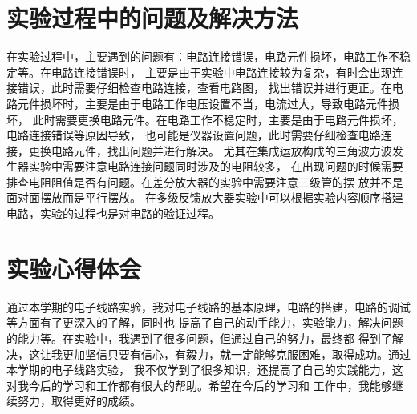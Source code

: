 \documentclass[12p,UTF8]{article}
\begin{document}
\begin{spacing}{1.25}
  \section{实验过程中的问题及解决方法}
  在实验过程中，主要遇到的问题有：电路连接错误，电路元件损坏，电路工作不稳定等。在电路连接错误时，
  主要是由于实验中电路连接较为复杂，有时会出现连接错误，此时需要仔细检查电路连接，查看电路图，
  找出错误并进行更正。在电路元件损坏时，主要是由于电路工作电压设置不当，电流过大，导致电路元件损坏，
  此时需要更换电路元件。在电路工作不稳定时，主要是由于电路元件损坏，电路连接错误等原因导致，
  也可能是仪器设置问题，此时需要仔细检查电路连接，更换电路元件，找出问题并进行解决。
  尤其在集成运放构成的三角波方波发生器实验中需要注意电路连接问题同时涉及的电阻较多，
  在出现问题的时候需要排查电阻阻值是否有问题。在差分放大器的实验中需要注意三级管的摆
  放并不是面对面摆放而是平行摆放。
  在多级反馈放大器实验中可以根据实验内容顺序搭建电路，实验的过程也是对电路的验证过程。

  \section{实验心得体会}
  通过本学期的电子线路实验，我对电子线路的基本原理，电路的搭建，电路的调试等方面有了更深入的了解，同时也
  提高了自己的动手能力，实验能力，解决问题的能力等。在实验中，我遇到了很多问题，但通过自己的努力，最终都
  得到了解决，这让我更加坚信只要有信心，有毅力，就一定能够克服困难，取得成功。通过本学期的电子线路实验，
  我不仅学到了很多知识，还提高了自己的实践能力，这对我今后的学习和工作都有很大的帮助。希望在今后的学习和
  工作中，我能够继续努力，取得更好的成绩。

\end{spacing}
\end{document}

